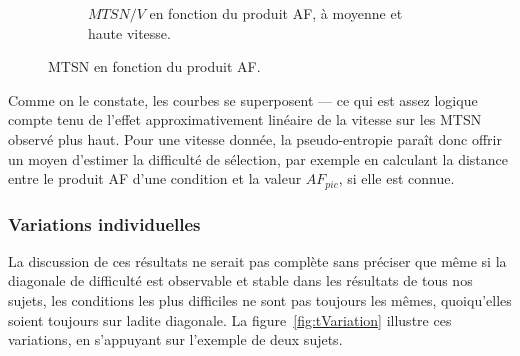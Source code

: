 \begin{figure}[!htb]
\begin{subfigure}[t]{0.49\textwidth}
			\caption{$MTSN/V$ en fonction du produit AF, à moyenne et haute vitesse.}
			\label{fig:tAF_Spnorm}
		\end{subfigure}
		\caption[MTSN en fonction du produit AF]{MTSN en fonction du produit AF.}
		\label{fig:tAF}
	\end{figure}
	
	Comme on le constate, les courbes se superposent --- ce qui est assez logique compte tenu de l'effet approximativement linéaire de la vitesse sur les MTSN observé plus haut. Pour une vitesse donnée, la pseudo-entropie paraît donc offrir un moyen d'estimer la difficulté de sélection, par exemple en calculant la distance entre le produit AF d'une condition et la valeur $AF_{pic}$, si elle est connue.
	
	
	\subsubsection{Variations individuelles}
	La discussion de ces résultats ne serait pas complète sans préciser que même si la \og diagonale de difficulté \fg{} est observable et stable dans les résultats de tous nos sujets, les conditions les plus difficiles ne sont pas toujours les mêmes, quoiqu'elles soient toujours sur ladite diagonale. La figure~\ref{fig:tVariation} illustre ces variations, en s'appuyant sur l'exemple de deux sujets.
	
